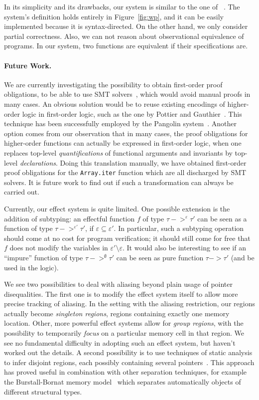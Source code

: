 \documentclass[a4paper]{llncs}
\begin{document}
In its simplicity and its drawbacks, our system is similar to the one
of ~\cite{regis-gianas-pottier-08}. The system's definition holds
entirely in Figure~\ref{fig:wp}, and it can be easily
implemented because it is syntax-directed. On the other hand, we only
consider partial correctness. Also, we can not reason about
observational equivalence of programs. In our system, two functions
are equivalent if their specifications are.


\paragraph{Future Work.}

We are currently investigating the possibility to obtain first-order proof
obligations, to be able to use SMT solvers~\cite{RanTin-SMTLIB}, which would
avoid manual proofs in many cases. An obvious solution would be to reuse
existing encodings of higher-order logic in first-order logic, such as the one
by Pottier and Gauthier~\cite{pottier-gauthier-hosc}. This technique has been
successfully employed by the Pangolin system~\cite{regis-gianas-pottier-08}.
Another option comes from our observation that in many cases, the proof
obligations for higher-order functions can actually be expressed in
first-order logic, when one replaces top-level {\em quantifications} of
functional arguments and invariants by top-level {\em declarations}. Doing
this translation manually, we have obtained first-order proof
obligations for the {\tt Array.iter} function which are all discharged by
SMT solvers. It is future work to find out if such a transformation can always
be carried out.

Currently, our effect system is quite limited. One possible extension is the
addition of subtyping: an effectful function $f$ of type $τ ->^ετ'$ can be seen
as a function of type $τ ->^{ε'}τ'$, if $ε\subseteq ε'$. In particular, such a
subtyping operation should come at no cost for program verification; it should
still come for free that $f$ does not modify the variables in $ε'\setminus ε$. It
would also be interesting to see if an ``impure'' function of type $τ
->^\emptyset τ'$ can be seen as pure function $τ -> τ'$ (and be used in the
logic).

We see two possibilities to deal with aliasing beyond plain usage of pointer
disequalities. The first one is to modify the effect system itself to allow
more precise tracking of aliasing. In the setting with the aliasing
restriction, our regions actually become {\em singleton regions}, regions
containing exactly one memory location. Other, more powerful effect systems
allow for {\em group regions}, with the possibility to temporarily {\em focus
} on a particular memory cell in that region. We see no fundamental difficulty
in adopting such an effect system, but haven't worked out the details. A
second possibility is to use techniques of static analysis to infer disjoint
regions, each possibly containing several pointers~\cite{hubert07hav}.
This approach has proved useful in combination with other separation
techniques, for example the Burstall-Bornat memory model~\cite{bornat00mpc}
which separates automatically objects of different structural types.
\end{document}
